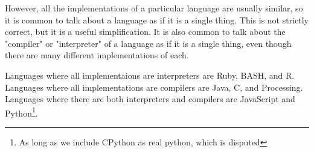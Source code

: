 \documentclass[twoside=false, DIV=14]{scrartcl}
\begin{document}
However, all the implementations of a particular language are usually similar, so it is common to talk about a language as if it is a single thing.  This is not strictly correct, but it is a useful simplification.  It is also common to talk about the "compiler" or "interpreter" of a language as if it is a single thing, even though there are many different implementations of each.

Languages where all implementaions are interpreters are Ruby, BASH, and R.  Languages where all implementations are compilers are Java, C, and Processing.  Languages where there are both interpreters and compilers are JavaScript and Python\footnote{As long as we include CPython as real python, which is disputed}.
\end{document}
